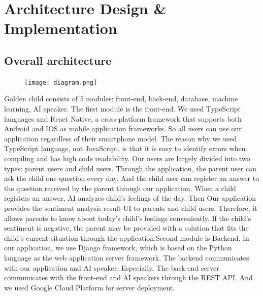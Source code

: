 \documentclass[conference]{IEEEtran}
\begin{document}
\section{\large{Architecture Design \& Implementation}}
\subsection{Overall architecture}
\begin{figure}[H]
                 \centering
                 \texttt{[image: diagram.png]}
                 \end{figure}
                
Golden child consists of 5 modules: front-end, back-end, database, machine learning, AI speaker. The first module is the front-end. We used TypeScript languages and React Native, a cross-platform framework that supports both Android and IOS as mobile application frameworks. So all users can use our application regardless of their smartphone model. The reason why we used TypeScript language, not JavaScript, is that it is easy to identify errors when compiling and has high code readability. Our users are largely divided into two types: parent users and child users. Through the application, the parent user can ask the child one question every day. And the child user can register an answer to the question received by the parent through our application. When a child registers an answer, AI analyzes child’s feelings of the day. Then Our application provides the sentiment analysis result UI to parents and child users. Therefore, it allows parents to know about today's child's feelings conveniently. If the child's sentiment is negative, the parent may be provided with a solution that fits the child's current situation through the application.Second module is Backend. In our application, we use Django framework, which is based on the Python language as the web application server framework. The backend communicates with our application and AI speaker. Especially, The back-end server communicates with the front-end and AI speakers through the REST API. And we used Google Cloud Platform for server deployment.
\end{document}
